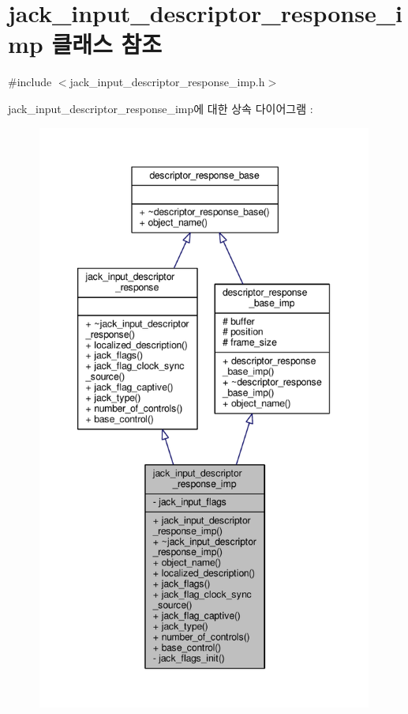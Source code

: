 \hypertarget{classavdecc__lib_1_1jack__input__descriptor__response__imp}{}\section{jack\+\_\+input\+\_\+descriptor\+\_\+response\+\_\+imp 클래스 참조}
\label{classavdecc__lib_1_1jack__input__descriptor__response__imp}


{\ttfamily \#include $<$jack\+\_\+input\+\_\+descriptor\+\_\+response\+\_\+imp.\+h$>$}



jack\+\_\+input\+\_\+descriptor\+\_\+response\+\_\+imp에 대한 상속 다이어그램 \+: 
\nopagebreak
\begin{figure}[H]
\begin{center}
\leavevmode
\includegraphics[height=550pt]{classavdecc__lib_1_1jack__input__descriptor__response__imp__inherit__graph}
\end{center}
\end{figure}


